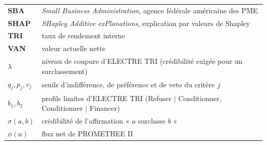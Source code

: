 \begin{center}
\begin{longtable}{>{\bfseries}p{2.6cm}p{11.8cm}}
SBA & \textit{Small Business Administration}, agence fédérale américaine des PME \\
SHAP & \textit{SHapley Additive exPlanations}, explication par valeurs de Shapley \\
TRI & taux de rendement interne \\
VAN & valeur actuelle nette \\
\midrule
$\lambda$ & niveau de coupure d'ELECTRE TRI (crédibilité exigée pour un surclassement) \\
$q_j, p_j, v_j$ & seuils d'indifférence, de préférence et de veto du critère $j$ \\
$b_1, b_2$ & profils limites d'ELECTRE TRI (Refuser $|$ Conditionner, Conditionner $|$ Financer) \\
$\sigma(a,b)$ & crédibilité de l'affirmation « $a$ surclasse $b$ » \\
$\phi(a)$ & flux net de PROMETHEE II \\
\bottomrule
\end{longtable}
\end{center}
